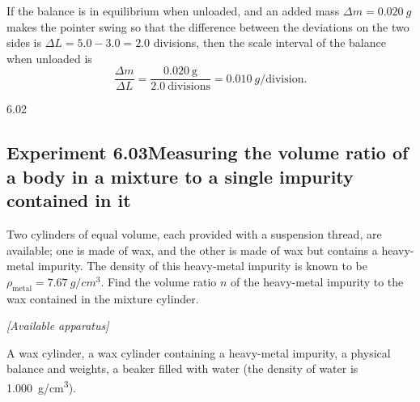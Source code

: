 If the balance is in equilibrium when unloaded, and an added mass $\Delta m=\SI{0.020}{g}$ makes the pointer swing so that the difference between the deviations on the two sides is $\Delta L=5.0-3.0=2.0$ divisions, then the scale interval of the balance when unloaded is
\begin{equation*}
\frac{\Delta m}{\Delta L}=\frac{0.020\ \mathrm{g}}{2.0\ \text{divisions}}=\SI{0.010}{g}/\text{division}.
\end{equation*}

\begin{figbox}{6.02}
\end{figbox}

\subsection*{Experiment 6.03\quad Measuring the volume ratio of a body in a mixture to a single impurity contained in it}

Two cylinders of equal volume, each provided with a suspension thread, are available; one is made of wax, and the other is made of wax but contains a heavy-metal impurity. The density of this heavy-metal impurity is known to be $\rho_{\text{metal}}=\SI{7.67}{g/cm^3}$. Find the volume ratio $n$ of the heavy-metal impurity to the wax contained in the mixture cylinder.

\noindent\textit{[Available apparatus]}

A wax cylinder, a wax cylinder containing a heavy-metal impurity, a physical balance and weights, a beaker filled with water (the density of water is \SI{1.000}{g/cm^3}).

